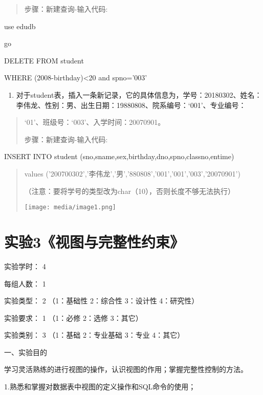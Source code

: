 \documentclass[
]{article}
\begin{document}
\begin{quote}
步骤：新建查询-输入代码:
\end{quote}

use edudb

go

DELETE FROM student

WHERE (2008-birthday)\textless20 and spno='003'

\begin{enumerate}
\def\labelenumi{\arabic{enumi}.}
\setcounter{enumi}{2}
\item
  对于student表，插入一条新记录，它的具体信息为，学号：20180302、姓名：李伟龙、性别：男、出生日期：19880808、院系编号：`001'、专业编号：
\end{enumerate}

\begin{quote}
`01'、班级号：`003'、入学时间：20070901。

步骤：新建查询-输入代码:
\end{quote}

INSERT INTO student (sno,sname,sex,birthday,dno,spno,classno,entime)

\begin{quote}
values ('200700302','李伟龙','男','880808','001','001','003','20070901')

（注意：要将学号的类型改为char（10），否则长度不够无法执行）

\texttt{[image: media/image1.png]}
\end{quote}

\hypertarget{ux5b9eux9a8c3ux89c6ux56feux4e0eux5b8cux6574ux6027ux7ea6ux675f}{%
\section{实验3《视图与完整性约束》}\label{ux5b9eux9a8c3ux89c6ux56feux4e0eux5b8cux6574ux6027ux7ea6ux675f}}

实验学时： { 4}

每组人数： { 1}

实验类型： { 2} （1：基础性 2：综合性 3：设计性 4：研究性）

实验要求： { 1} （1：必修 2：选修 3：其它）

实验类别： { 3} （1：基础 2：专业基础 3：专业 4：其它）

{}

一、实验目的

学习灵活熟练的进行视图的操作，认识视图的作用；掌握完整性控制的方法。

1.熟悉和掌握对数据表中视图的定义操作和SQL命令的使用；
\end{document}
